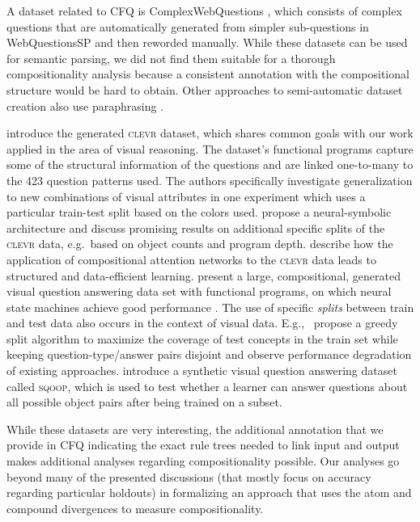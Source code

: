 \documentclass[letterpaper]{article}
\begin{document}
A dataset related to CFQ is ComplexWebQuestions \citep{talmor18compwebq}, which consists of complex questions that are automatically generated from simpler sub-questions in WebQuestionsSP \citep{yih2016webqsp} and then reworded manually. While these datasets can be used for semantic parsing, we did not find them suitable for a thorough compositionality analysis because a consistent annotation with the compositional structure would be hard to obtain.
Other approaches to semi-automatic dataset creation also use paraphrasing \citep{wang2015semantic-overnight,su2016generating}.

\citet{CLEVR} introduce the generated \textsc{clevr} dataset, which shares common goals with our work applied in the area of visual reasoning. The dataset's functional programs
capture some of the structural information of the questions and are linked one-to-many to the 423 question patterns used.
The authors specifically investigate generalization to new combinations of visual attributes in one experiment which uses a particular train-test split based on the colors used. 
\citet{mao2019neuro} propose a neural-symbolic architecture and discuss promising results on additional specific splits of the \textsc{clevr} data, e.g.\ based on object counts and program depth.
\citet{arad2018compositional} describe how the application of compositional attention networks to the \textsc{clevr} data leads to structured and data-efficient learning. 
\citet{hudson2019gqa} present a large, compositional, generated visual question answering data set with
functional programs, on which neural state machines achieve good performance \citep{hudson2019nsm}. 
The use of specific {\em splits} between train and test data also occurs in the context of visual data. E.g.,\ \citet{agrawal2018don} propose a greedy split algorithm to maximize the coverage of test concepts in the train set
while keeping question-type/answer pairs disjoint and observe performance degradation of existing approaches.
\citet{bahdanau2019systematic} introduce a synthetic visual question answering dataset called \textsc{sqoop}, which is used to test whether a learner can answer questions about all possible object pairs after being trained on a subset. 

While these datasets are very interesting, the additional annotation that we provide in CFQ indicating the exact rule trees needed to link input and output makes additional analyses regarding compositionality possible.
Our analyses go beyond many of the presented discussions (that mostly focus on accuracy regarding particular holdouts) in formalizing an approach that uses the atom and compound divergences to measure compositionality.
\end{document}
